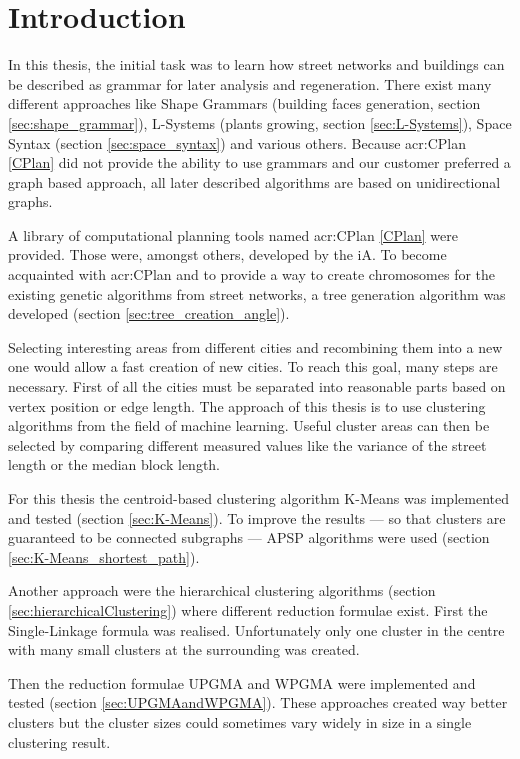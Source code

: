 \chapter{Introduction}
In this thesis, the initial task was to learn how street networks and buildings can be described as grammar for later analysis and regeneration. There exist many different approaches like Shape Grammars (building faces generation, section \ref{sec:shape_grammar}), L-Systems (plants growing, section \ref{sec:L-Systems}), Space Syntax (section \ref{sec:space_syntax}) and various others. Because \acrshort{acr:CPlan} \ref{CPlan} did not provide the ability to use grammars and our customer preferred a graph based approach, all later described algorithms are based on unidirectional graphs.

A library of computational planning tools named \acrshort{acr:CPlan} \ref{CPlan} were provided. Those were, amongst others, developed by the \gls{iA}. To become acquainted with \acrshort{acr:CPlan} and to provide a way to create chromosomes for the existing genetic algorithms from street networks, a tree generation algorithm was developed (section \ref{sec:tree_creation_angle}).

Selecting interesting areas from different cities and recombining them into a new one would allow a fast creation of new cities. To reach this goal, many steps are necessary. First of all the cities must be separated into reasonable parts based on vertex position or edge length. The approach of this thesis is to use clustering algorithms from the field of machine learning. Useful cluster areas can then be selected by comparing different measured values like the variance of the street length or the median block length.

For this thesis the centroid-based clustering algorithm K-Means was implemented and tested (section \ref{sec:K-Means}). To improve the results --- so that clusters are guaranteed to be connected subgraphs --- \gls{APSP} algorithms were used (section \ref{sec:K-Means_shortest_path}).

Another approach were the hierarchical clustering algorithms (section \ref{sec:hierarchicalClustering}) where different reduction formulae exist. First the Single-Linkage formula was realised. Unfortunately only one cluster in the centre with many small clusters at the surrounding was created.

\newpage

Then the reduction formulae \gls{UPGMA} and \gls{WPGMA} were implemented and tested (section \ref{sec:UPGMAandWPGMA}). These approaches created way better clusters but the cluster sizes could sometimes vary widely in size in a single clustering result.

